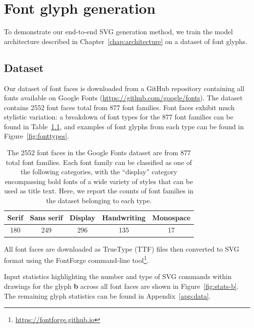 \chapter{Font glyph generation}\label{chap:training} To demonstrate our end-to-end SVG generation method, we train the model architecture described in Chapter~\ref{chap:architecture} on a dataset of font glyphs.

\section{Dataset}\label{sec:font-data}
Our dataset of font faces is downloaded from a GitHub repository containing all fonts available on Google Fonts (\url{https://github.com/google/fonts}).
The dataset contains 2552 font faces total from 877 font families.
Font faces exhibit much stylistic variation: a breakdown of font types for the 877 font families can be found in Table~\ref{tbl:fonttypes}, and examples of font glyphs from each type can be found in Figure~\ref{fig:fonttypes}.

\begin{table}[h]
\centering
\caption[A breakdown of font types in the Google Fonts dataset]
    {The 2552 font faces in the Google Fonts dataset are from 877 total font families.
    Each font family can be classified as one of the following categories, with the ``display'' category encompassing bold fonts of a wide variety of styles that can be used as title text.
    Here, we report the counts of font families in the dataset belonging to each type.\label{tbl:fonttypes}}
\begin{tabular}{c c c c c}
\toprule
    Serif & Sans serif & Display & Handwriting & Monospace \\ \midrule
    180 & 249 & 296 & 135 & 17
\end{tabular}
\end{table}

All font faces are downloaded as TrueType (TTF) files then converted to SVG format using the FontForge command-line tool\footnote{\url{https://fontforge.github.io}}.

Input statistics highlighting the number and type of SVG commands within drawings for the glyph \textbf{b} across all font faces are shown in Figure~\ref{fig:stats-b}.
The remaining glyph statistics can be found in Appendix~\ref{app:data}.

